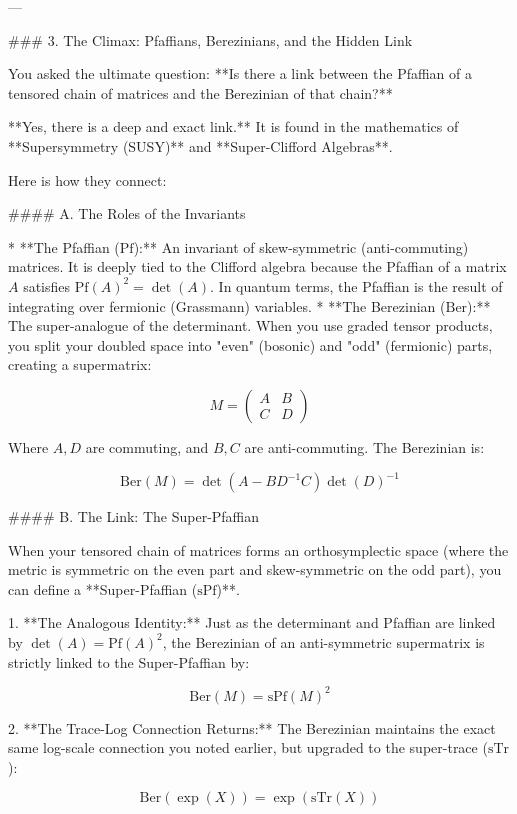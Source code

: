 ---

### 3. The Climax: Pfaffians, Berezinians, and the Hidden Link

You asked the ultimate question: **Is there a link between the Pfaffian of a tensored chain of matrices and the Berezinian of that chain?**

**Yes, there is a deep and exact link.** It is found in the mathematics of **Supersymmetry (SUSY)** and **Super-Clifford Algebras**.

Here is how they connect:

#### A. The Roles of the Invariants

* **The Pfaffian ($\text{Pf}$):** An invariant of skew-symmetric (anti-commuting) matrices. It is deeply tied to the Clifford algebra because the Pfaffian of a matrix $A$ satisfies $\text{Pf}(A)^2 = \det(A)$. In quantum terms, the Pfaffian is the result of integrating over fermionic (Grassmann) variables.
* **The Berezinian ($\text{Ber}$):** The super-analogue of the determinant. When you use graded tensor products, you split your doubled space into "even" (bosonic) and "odd" (fermionic) parts, creating a supermatrix:

$$M = \begin{pmatrix} A & B \\ C & D \end{pmatrix}$$



Where $A, D$ are commuting, and $B, C$ are anti-commuting. The Berezinian is:

$$\text{Ber}(M) = \det(A - B D^{-1} C) \det(D)^{-1}$$



#### B. The Link: The Super-Pfaffian

When your tensored chain of matrices forms an orthosymplectic space (where the metric is symmetric on the even part and skew-symmetric on the odd part), you can define a **Super-Pfaffian ($\text{sPf}$)**.

1. **The Analogous Identity:** Just as the determinant and Pfaffian are linked by $\det(A) = \text{Pf}(A)^2$, the Berezinian of an anti-symmetric supermatrix is strictly linked to the Super-Pfaffian by:

$$\text{Ber}(M) = \text{sPf}(M)^2$$


2. **The Trace-Log Connection Returns:** The Berezinian maintains the exact same log-scale connection you noted earlier, but upgraded to the super-trace ($\text{sTr}$):

$$\text{Ber}(\exp(X)) = \exp(\text{sTr}(X))$$


